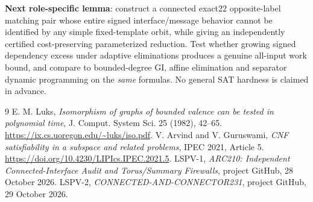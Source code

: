 \documentclass[10pt]{article}
\begin{document}
\noindent\textbf{Next role-specific lemma}: construct a connected exact22 opposite-label matching pair whose entire signed interface/message behavior cannot be identified by any simple fixed-template orbit, while giving an independently certified cost-preserving parameterized reduction. Test whether growing signed dependency excess under adaptive eliminations produces a genuine all-input work bound, and compare to bounded-degree GI, affine elimination and separator dynamic programming on the \emph{same} formulas. No general SAT hardness is claimed in advance.
\begin{thebibliography}{9}
 E. M. Luks, \emph{Isomorphism of graphs of bounded valence can be tested in polynomial time}, J. Comput. System Sci. 25 (1982), 42--65. \url{https://ix.cs.uoregon.edu/~luks/iso.pdf}.
 V. Arvind and V. Guruswami, \emph{CNF satisfiability in a subspace and related problems}, IPEC 2021, Article 5. \url{https://doi.org/10.4230/LIPIcs.IPEC.2021.5}.
 LSPV-1, \emph{ARC210: Independent Connected-Interface Audit and Torus/Summary Firewalls}, project GitHub, 28 October 2026.
 LSPV-2, \emph{CONNECTED-AND-CONNECTOR231}, project GitHub, 29 October 2026.
\end{thebibliography}
\end{document}
